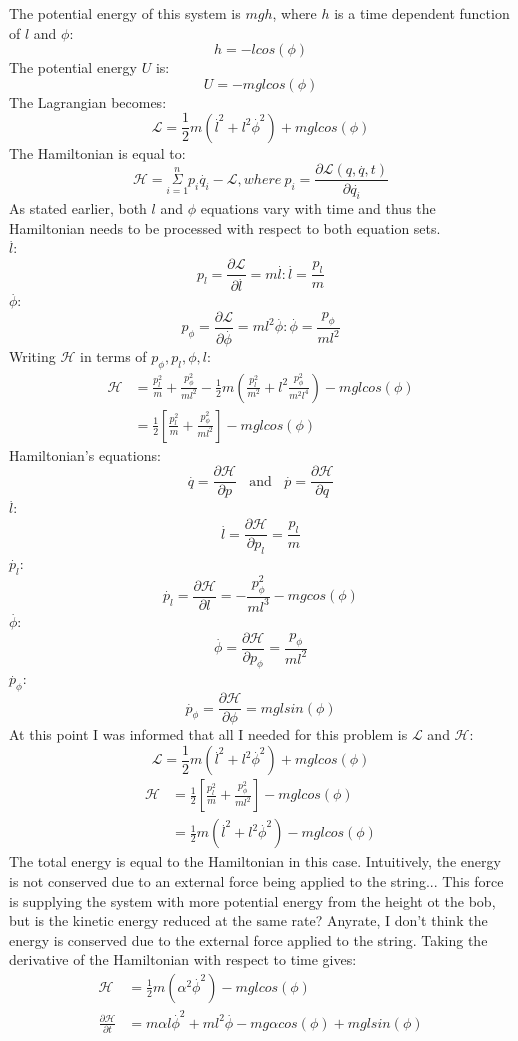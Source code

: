 \documentclass[a4paper,12pt]{article}
\newcommand{\F}[2]{\ensuremath{\frac{#1}{#2}}}
\newcommand{\vel}[1]{\overset{.}{#1}}
\newcommand{\prt}[2]{\frac{\partial#1}{\partial#2}}
\newcommand{\LP}{\left(}
\newcommand{\RP}{\right)}
\begin{document}
The potential energy of this system is $mgh$, where $h$ is a time dependent function of $l$ and $\phi$:
\[h=-lcos(\phi)\]
The potential energy $U$ is:
\[U=-mglcos(\phi)\]
The Lagrangian becomes:
\[\mathcal{L}=\F{1}{2}m(\vel{l}^2+l^2\vel{\phi}^2)+mglcos(\phi )\]
The Hamiltonian is equal to:
\[\mathcal{H}=\overset{n}{\underset{i=1}{\Sigma}}p_i\vel{q}_i-\mathcal{L},where~ p_i=\F{\partial\mathcal{L}(q,\vel{q},t)}{\partial\vel{q_i}}\]
As stated earlier, both $l$ and $\phi$ equations vary with time and thus the Hamiltonian needs to be processed with respect to both equation sets.\\
$\vel{l}$:
\[p_l=\prt{\mathcal{L}}{\vel{l}}=m\vel{l}: \vel{l}=\F{p_l}{m}\]
$\vel{\phi}$:
\[p_\phi=\prt{\mathcal{L}}{\vel{\phi}}=ml^2\vel\phi:\vel\phi=\F{p_\phi}{ml^2}\]
Writing $\mathcal{H}$ in terms of $p_\phi, p_l, \phi, l$:
\begin{align*}
\mathcal{H}&=\F{p_l^2}{m}+\F{p_\phi^2}{ml^2}-\F{1}{2}m\LP\F{p_l^2}{m^2}+l^2\F{p_\phi^2}{m^2l^4}\RP-mglcos(\phi)\\
&=\F{1}{2}\left[\F{p_l^2}{m}+\F{p_\phi^2}{ml^2}\right]-mglcos(\phi)
\end{align*}
Hamiltonian's equations:
\[\vel{q}=\prt{\mathcal{H}}{p}~~~~\text{and}~~~~\vel{p}=\prt{\mathcal{H}}{q}\]
$\vel{l}$:
\[\vel{l}=\prt{\mathcal{H}}{p_l}=\F{p_l}{m}\]
$\vel{p}_l$:
\[\vel{p}_l=\prt{\mathcal{H}}{l}=-\F{p_\phi^2}{ml^3}-mgcos(\phi)\]
$\vel{\phi}$:
\[\vel{\phi}=\prt{\mathcal{H}}{p_\phi}=\F{p_\phi}{ml^2}\]
$\vel{p}_\phi$:
\[\vel{p}_\phi=\prt{\mathcal{H}}{\phi}=mglsin(\phi)\]
At this point I was informed that all I needed for this problem is $\mathcal{L}$ and $\mathcal{H}$:
\[\mathcal{L}=\F{1}{2}m(\vel{l}^2+l^2\vel{\phi}^2)+mglcos(\phi )\]
\begin{align*}
\mathcal{H}&=\F{1}{2}\left[\F{p_l^2}{m}+\F{p_\phi^2}{ml^2}\right]-mglcos(\phi)\\
&=\F{1}{2}m(\vel{l}^2+l^2\vel{\phi}^2)-mglcos(\phi )
\end{align*}
The total energy is equal to the Hamiltonian in this case.  Intuitively, the energy is not conserved due to an external force being applied to the string...  This force is supplying the system with more potential energy from the height ot the bob, but is the kinetic energy reduced at the same rate?  Anyrate, I don't think the energy is conserved due to the external force applied to the string.
Taking the derivative of the Hamiltonian with respect to time gives:
\begin{align*}
\mathcal{H}&=\F{1}{2}m(\alpha^2\vel{\phi}^2)-mglcos(\phi)\\
\prt{\mathcal{H}}{t}&=m\alpha l\vel{\phi}^2+ml^2\vel{\phi}-mg\alpha cos(\phi)+mglsin(\phi)
\end{align*}
\end{document}
